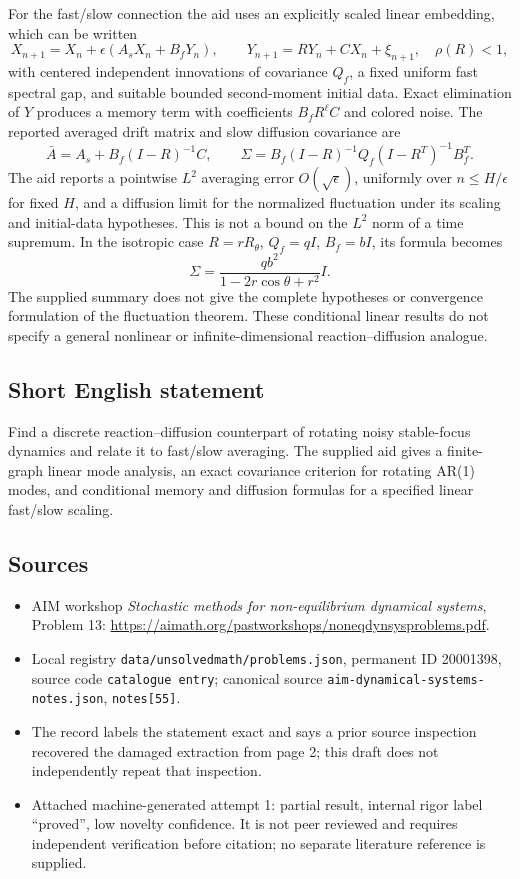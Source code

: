\documentclass[11pt]{article}
\begin{document}
For the fast/slow connection the aid uses an explicitly scaled linear embedding, which can be written
\[
 X_{n+1}=X_n+\epsilon(A_sX_n+B_fY_n),\qquad
 Y_{n+1}=RY_n+CX_n+\xi_{n+1},\quad \rho(R)<1,
\]
with centered independent innovations of covariance \(Q_f\), a fixed uniform fast spectral gap, and suitable bounded second-moment initial data. Exact elimination of \(Y\) produces a memory term with coefficients \(B_fR^\ell C\) and colored noise. The reported averaged drift matrix and slow diffusion covariance are
\[
 \bar A=A_s+B_f(I-R)^{-1}C,\qquad
 \Sigma=B_f(I-R)^{-1}Q_f(I-R^T)^{-1}B_f^T.
\]
The aid reports a pointwise \(L^2\) averaging error \(O(\sqrt\epsilon)\), uniformly over \(n\le H/\epsilon\) for fixed \(H\), and a diffusion limit for the normalized fluctuation under its scaling and initial-data hypotheses. This is not a bound on the \(L^2\) norm of a time supremum. In the isotropic case \(R=rR_\theta\), \(Q_f=qI\), \(B_f=bI\), its formula becomes
\[
 \Sigma=\frac{qb^2}{1-2r\cos\theta+r^2}I.
\]
The supplied summary does not give the complete hypotheses or convergence formulation of the fluctuation theorem. These conditional linear results do not specify a general nonlinear or infinite-dimensional reaction--diffusion analogue.
\subsection{Short English statement}
Find a discrete reaction--diffusion counterpart of rotating noisy stable-focus dynamics and relate it to fast/slow averaging. The supplied aid gives a finite-graph linear mode analysis, an exact covariance criterion for rotating AR(1) modes, and conditional memory and diffusion formulas for a specified linear fast/slow scaling.
\subsection{Sources}
\begin{itemize}
\item AIM workshop \emph{Stochastic methods for non-equilibrium dynamical systems}, Problem 13: \url{https://aimath.org/pastworkshops/noneqdynsysproblems.pdf}.
\item Local registry \texttt{data/unsolvedmath/problems.json}, permanent ID 20001398, source code \texttt{catalogue entry}; canonical source \texttt{aim-dynamical-systems-notes.json}, \texttt{notes[55]}.
\item The record labels the statement exact and says a prior source inspection recovered the damaged extraction from page 2; this draft does not independently repeat that inspection.
\item Attached machine-generated attempt 1: partial result, internal rigor label ``proved'', low novelty confidence. It is not peer reviewed and requires independent verification before citation; no separate literature reference is supplied.
\end{itemize}
\end{document}
